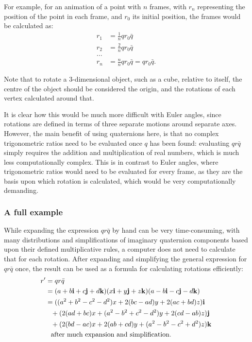 \documentclass[10pt]{article}
\begin{document}
For example, for an animation of a point with $n$ frames, with $r_n$ representing the position of the point in each frame, and $r_0$ its initial position, the frames would be calculated as:
\begin{equation}
    \begin{aligned}
        r_1 &= \frac{1}{n}qr_0\bar{q} \\
        r_2 &= \frac{2}{n}qr_0\bar{q} \\
        ... \\
        r_n &= \frac{n}{n}qr_0\bar{q} = qr_0\bar{q}.
    \end{aligned}
\end{equation}

Note that to rotate a 3-dimensional object, such as a cube, relative to itself, the centre of the object should be considered the origin, and the rotations of each vertex calculated around that.

It is clear how this would be much more difficult with Euler angles, since rotations are defined in terms of three separate motions around separate axes. However, the main benefit of using quaternions here, is that no complex trigonometric ratios need to be evaluated once $q$ has been found: evaluating $qr\bar{q}$ simply requires the addition and multiplication of real numbers, which is much less computationally complex. This is in contrast to Euler angles, where trigonometric ratios would need to be evaluated for every frame, as they are the basis upon which rotation is calculated, which would be very computationally demanding.

\subsubsection{A full example}

While expanding the expression $qr\bar{q}$ by hand can be very time-consuming, with many distributions and simplifications of imaginary quaternion components based upon their defined multiplicative rules, a computer does not need to calculate that for each rotation. After expanding and simplifying the general expression for $qr\bar{q}$ once, the result can be used as a formula for calculating rotations efficiently:
\begin{equation}
    \begin{aligned}
        r' &= qr\bar{q} \\
           &= (a + b\vb{i} + c\vb{j} + d\vb{k})(x\vb{i} + y\vb{j} + z\vb{k})(a - b\vb{i} - c\vb{j} - d\vb{k}) \\
           &= ((a^2 + b^2 - c^2 - d^2)x + 2(bc-ad)y+2(ac+bd)z)\vb{i} \\
           &\phantom{= } + (2(ad+bc)x + (a^2 - b^2 + c^2 - d^2)y + 2(cd-ab)z)\vb{j} \\
           &\phantom{= } + (2(bd-ac)x + 2(ab+cd)y + (a^2 - b^2 - c^2 + d^2)z)\vb{k} \\
           &\phantom{= } \text{after much expansion and simplification.}
    \end{aligned}
\end{equation}
\end{document}
